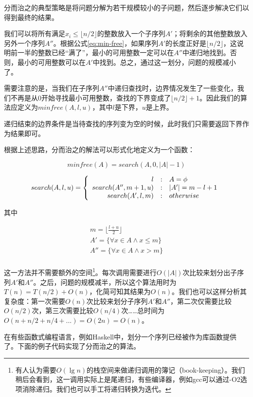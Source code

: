 \documentclass{article}
\begin{document}
分而治之的典型策略是将问题分解为若干规模较小的子问题，然后逐步解决它们以得到最终的结果。

我们可以将所有满足$x_i \leq \lfloor n/2 \rfloor$的整数放入一个子序列$A'$；将剩余的其他整数放入另外一个序列$A''$。根据公式\ref{eq:min-free}，如果序列$A'$的长度正好是$\lfloor n/2 \rfloor$，这说明前一半的整数已经“满了”，最小的可用整数一定可以在$A''$中递归地找到。否则，最小的可用整数可以在$A'$中找到。总之，通过这一划分，问题的规模减小了。

需要注意的是，当我们在子序列$A''$中递归查找时，边界情况发生了一些变化，我们不再是从0开始寻找最小可用整数，查找的下界变成了$\lfloor n/2 \rfloor + 1$。因此我们的算法应定义为$minfree(A, l, u)$，其中$l$是下界，$u$是上界。

递归结束的边界条件是当待查找的序列变为空的时候，此时我们只需要返回下界作为结果即可。

根据上述思路，分而治之的解法可以形式化地定义为一个函数：

\[
minfree(A) = search(A, 0, |A|-1)
\]

\[
search(A, l, u) = \left \{
       \begin{array}
       {r@{\quad:\quad}l}
       l & A = \phi \\
       search(A'', m+1, u) &  |A'| = m - l + 1 \\
       search(A',  l, m) & otherwise
       \end{array}
\right.
\]

其中

\[ \begin{array}{l}
m = \displaystyle \lfloor \frac{l+u}{2} \rfloor \\
A'  = \{ \forall x \in A \wedge x \leq m \} \\
A'' = \{ \forall x \in A \wedge x > m \} \\
\end{array} \]

这一方法并不需要额外的空间\footnote{有人认为需要$O(\lg n)$的栈空间来做递归调用的簿记（book-keeping）。我们稍后会看到，这一调用实际上是尾递归，有些编译器，例如gcc可以通过-O2选项消除递归。我们也可以手工将递归转换为迭代。}。每次调用需要进行$O(|A|)$次比较来划分出子序列$A'$和$A''$。之后，问题的规模减半，所以这个算法用时为$T(n) = T(n/2) + O(n)$，化简可知其结果为$O(n)$。我们也可以这样分析其复杂度：第一次需要$O(n)$次比较来划分子序列$A'$和$A''$，第二次仅需要比较$O(n/2)$次，第三次需要比较$O(n/4)$次……总时间为$O(n + n/2 + n/4 + ...) = O(2n) = O(n)$。

在有些函数式编程语言，例如Haskell中，划分一个序列已经被作为库函数提供了。下面的例子代码实现了分而治之的算法。
\end{document}
